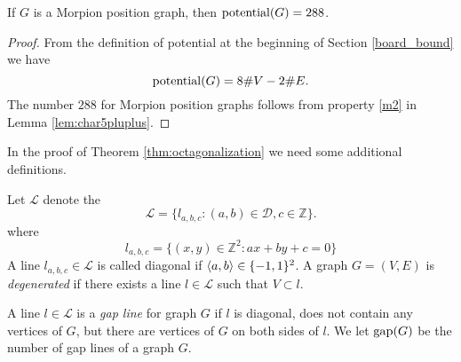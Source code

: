 \begin{lemma}
 If $G$ is a Morpion position graph, then $\operatorname{potential}(G) = 288$.
\end{lemma}
\begin{proof}
  From the definition of potential at the beginning of Section \ref{board_bound} we have %
  \[
     \operatorname{potential}(G) = 8 \# V - 2 \# E.
  \]
 The number $288$ for Morpion position graphs follows from property \ref{m2} in Lemma \ref{lem:char5pluplus}.
\end{proof}


\noindent
In the proof of Theorem \ref{thm:octagonalization} we need some additional definitions. 
\begin{definition}
Let $\mathcal{L}$  denote the 
\[
  \mathcal{L} = \{ l_{a,b,c} \colon (a,b) \in \mathcal{D},c \in \mathbb{Z} \}.
\]
where
\[
  l_{a,b,c} = \{ (x,y) \in \mathbb{Z}^2 \colon ax + by + c = 0 \}
\]
A line $l_{a,b,c}\in \mathcal{L}$ is called diagonal if ${\langle} a,b{\rangle}\in \{ -1,1\}^2$. 
A graph $G = (V,E)$ is \emph{degenerated} if there exists a line $l \in \mathcal{L}$ such that $V \subset l$. %
\end{definition}

\begin{definition}
  A line $l \in \mathcal{L}$ is a \emph{gap line} for graph $G$ if $l$ is diagonal, 
    does not contain any vertices of $G$,
    but there are vertices of $G$ on both sides of $l$.
    We let $\operatorname{gap}(G)$ be the number of gap lines of a graph $G$.
\end{definition}

